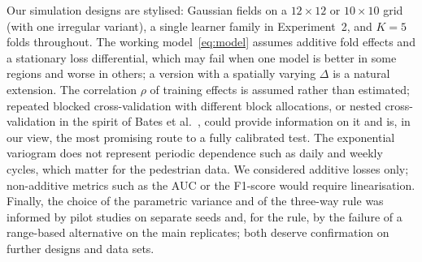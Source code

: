 Our simulation designs are stylised: Gaussian fields on a $12\times12$ or $10\times10$ grid (with one irregular variant), a single learner family in Experiment~2, and $K=5$ folds throughout. The working model~\eqref{eq:model} assumes additive fold effects and a stationary loss differential, which may fail when one model is better in some regions and worse in others; a version with a spatially varying $\Delta$ is a natural extension. The correlation $\rho$ of training effects is assumed rather than estimated; repeated blocked cross-validation with different block allocations, or nested cross-validation in the spirit of Bates et al.~\cite{bates2024}, could provide information on it and is, in our view, the most promising route to a fully calibrated test. The exponential variogram does not represent periodic dependence such as daily and weekly cycles, which matter for the pedestrian data. We considered additive losses only; non-additive metrics such as the AUC or the F1-score would require linearisation. Finally, the choice of the parametric variance and of the three-way rule was informed by pilot studies on separate seeds and, for the rule, by the failure of a range-based alternative on the main replicates; both deserve confirmation on further designs and data sets.
